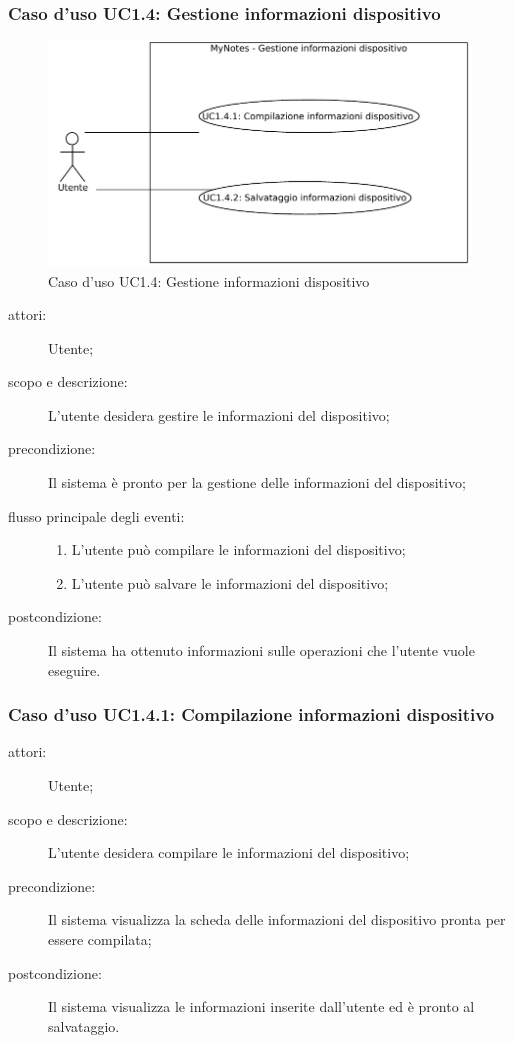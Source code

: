 \subsubsection{Caso d'uso UC1.4: Gestione informazioni dispositivo}
\begin{figure}[htb]
\centering
\includegraphics[scale=0.6]{gfx/useCase/MN_UC1-4_Gestione_informazioni_dispositivo.pdf}
\caption{Caso d'uso UC1.4: Gestione informazioni dispositivo}
\label{fig:My notes UC1.4}
\end{figure}

\begin{description}
\item[attori:] Utente;
\item[scopo e descrizione:] L'utente desidera gestire le informazioni del dispositivo;
\item[precondizione:] Il sistema è pronto per la gestione delle informazioni del dispositivo;
\item[flusso principale degli eventi:] \hfill 
	\begin{enumerate}
	\item L'utente può compilare le informazioni del dispositivo;
	\item L'utente può salvare le informazioni del dispositivo;
	\end{enumerate}
\item[postcondizione:] Il sistema ha ottenuto informazioni sulle operazioni che l'utente vuole eseguire.
\end{description}

\subsubsection{Caso d'uso UC1.4.1: Compilazione informazioni dispositivo}
\begin{description}
\item[attori:] Utente;
\item[scopo e descrizione:] L'utente desidera compilare le informazioni del dispositivo;
\item[precondizione:] Il sistema visualizza la scheda delle informazioni del dispositivo pronta per essere compilata;
\item[postcondizione:] Il sistema visualizza le informazioni inserite dall'utente ed è pronto al salvataggio.
\end{description}

